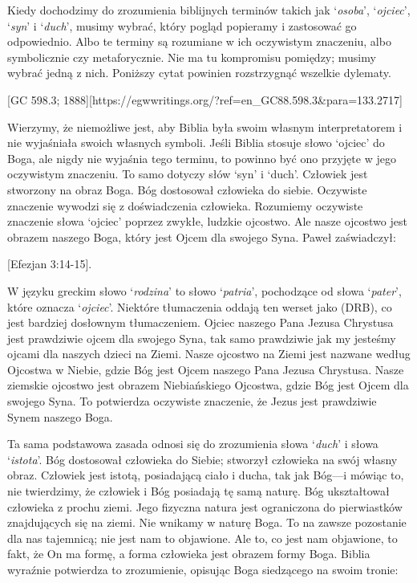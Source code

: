 Kiedy dochodzimy do zrozumienia biblijnych terminów takich jak ‘\textit{osoba}’, ‘\textit{ojciec}’, ‘\textit{syn}’ i ‘\textit{duch}’, musimy wybrać, który pogląd popieramy i zastosować go odpowiednio. Albo te terminy są rozumiane w ich oczywistym znaczeniu, albo symbolicznie czy metaforycznie. Nie ma tu kompromisu pomiędzy; musimy wybrać jedną z nich. Poniższy cytat powinien rozstrzygnąć wszelkie dylematy.

[GC 598.3; 1888][https://egwwritings.org/?ref=en\_GC88.598.3&para=133.2717]

Wierzymy, że niemożliwe jest, aby Biblia była swoim własnym interpretatorem i nie wyjaśniała swoich własnych symboli. Jeśli Biblia stosuje słowo ‘ojciec’ do Boga, ale nigdy nie wyjaśnia tego terminu, to powinno być ono przyjęte w jego oczywistym znaczeniu. To samo dotyczy słów ‘syn’ i ‘duch’. Człowiek jest stworzony na obraz Boga. Bóg dostosował człowieka do siebie. Oczywiste znaczenie wywodzi się z doświadczenia człowieka. Rozumiemy oczywiste znaczenie słowa ‘ojciec’ poprzez zwykłe, ludzkie ojcostwo. Ale nasze ojcostwo jest obrazem naszego Boga, który jest Ojcem dla swojego Syna. Paweł zaświadczył:

[Efezjan 3:14-15].

W języku greckim słowo ‘\textit{rodzina}’ to słowo ‘\textit{patria}’, pochodzące od słowa ‘\textit{pater}’, które oznacza ‘\textit{ojciec}’. Niektóre tłumaczenia oddają ten werset jako  (DRB), co jest bardziej dosłownym tłumaczeniem. Ojciec naszego Pana Jezusa Chrystusa jest prawdziwie ojcem dla swojego Syna, tak samo prawdziwie jak my jesteśmy ojcami dla naszych dzieci na Ziemi. Nasze ojcostwo na Ziemi jest nazwane według Ojcostwa w Niebie, gdzie Bóg jest Ojcem naszego Pana Jezusa Chrystusa. Nasze ziemskie ojcostwo jest obrazem Niebiańskiego Ojcostwa, gdzie Bóg jest Ojcem dla swojego Syna. To potwierdza oczywiste znaczenie, że Jezus jest prawdziwie Synem naszego Boga.

Ta sama podstawowa zasada odnosi się do zrozumienia słowa ‘\textit{duch}’ i słowa ‘\textit{istota}’. Bóg dostosował człowieka do Siebie; stworzył człowieka na swój własny obraz. Człowiek jest istotą, posiadającą ciało i ducha, tak jak Bóg—i mówiąc to, nie twierdzimy, że człowiek i Bóg posiadają tę samą naturę. Bóg ukształtował człowieka z prochu ziemi. Jego fizyczna natura jest ograniczona do pierwiastków znajdujących się na ziemi. Nie wnikamy w naturę Boga. To na zawsze pozostanie dla nas tajemnicą; nie jest nam to objawione. Ale to, co jest nam objawione, to fakt, że On ma formę, a forma człowieka jest obrazem formy Boga. Biblia wyraźnie potwierdza to zrozumienie, opisując Boga siedzącego na swoim tronie:

